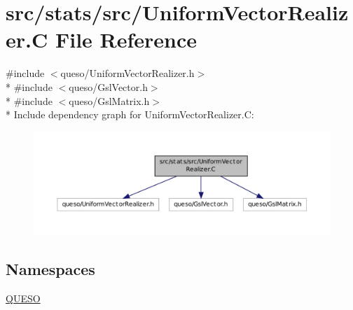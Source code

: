 \hypertarget{_uniform_vector_realizer_8_c}{\section{src/stats/src/\-Uniform\-Vector\-Realizer.C File Reference}
\label{_uniform_vector_realizer_8_c}
}
{\ttfamily \#include $<$queso/\-Uniform\-Vector\-Realizer.\-h$>$}\\*
{\ttfamily \#include $<$queso/\-Gsl\-Vector.\-h$>$}\\*
{\ttfamily \#include $<$queso/\-Gsl\-Matrix.\-h$>$}\\*
Include dependency graph for Uniform\-Vector\-Realizer.\-C\-:
\nopagebreak
\begin{figure}[H]
\begin{center}
\leavevmode
\includegraphics[width=350pt]{_uniform_vector_realizer_8_c__incl}
\end{center}
\end{figure}
\subsection*{Namespaces}
\begin{DoxyCompactItemize}
\item 
\hyperlink{namespace_q_u_e_s_o}{Q\-U\-E\-S\-O}
\end{DoxyCompactItemize}
